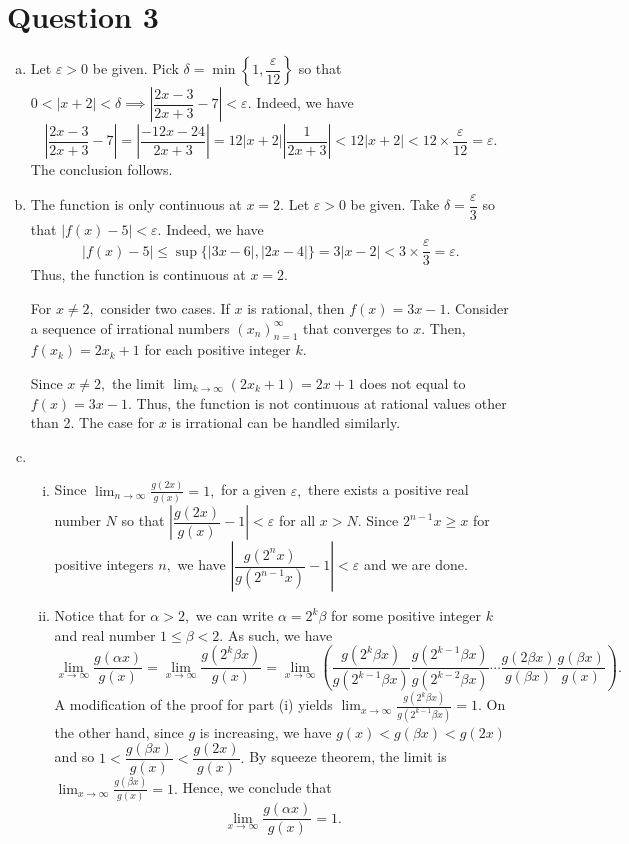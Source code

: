 \documentclass{article}
\begin{document}
\section*{Question 3}
\begin{enumerate}[(a)]
    \item Let $\varepsilon>0$ be given. Pick $\delta=\min\left\{1,\dfrac{\varepsilon}{12}\right\}$ so that $0<|x+2|<\delta\implies \left|\dfrac{2x-3}{2x+3}-7\right|<\varepsilon.$ Indeed, we have $$\left|\frac{2x-3}{2x+3}-7\right|=\left|\frac{-12x-24}{2x+3}\right|=12|x+2|\left|\frac{1}{2x+3}\right|<12|x+2|<12\times\frac{\varepsilon}{12}=\varepsilon.$$ The conclusion follows.
    \item The function is only continuous at $x=2.$ Let $\varepsilon>0$ be given. Take $\delta=\dfrac{\varepsilon}{3}$ so that $|f(x)-5|<\varepsilon.$ Indeed, we have $$ |f(x)-5|\leq \sup\{|3x-6|,|2x-4|\}=3|x-2|<3\times\frac{\varepsilon}{3}=\varepsilon.$$ Thus, the function is continuous at $x=2.$
    
    For $x\neq2,$ consider two cases. If $x$ is rational, then $f(x)=3x-1.$ Consider a sequence of irrational numbers $(x_n)^{\infty}_{n=1}$ that converges to $x.$ Then, $f(x_k)=2x_k+1$ for each positive integer $k.$ 
    
    Since $x\neq 2,$ the limit $\displaystyle\lim_{k\to\infty}(2x_k+1)=2x+1$ does not equal to $f(x)=3x-1.$ Thus, the function is not continuous at rational values other than 2. The case for $x$ is irrational can be handled similarly.
    \item \begin{enumerate}[(i)]
        \item Since $\displaystyle\lim_{n\to\infty}\frac{g(2x)}{g(x)}=1,$ for a given $\varepsilon,$ there exists a positive real number $N$ so that $\left|\dfrac{g(2x)}{g(x)}-1\right|<\varepsilon$ for all $x>N.$ Since $2^{n-1}x\geq x$ for positive integers $n,$ we have $\left|\dfrac{g(2^nx)}{g(2^{n-1}x)}-1\right|<\varepsilon$ and we are done.
        \item Notice that for $\alpha>2,$ we can write $\alpha=2^k\beta$ for some positive integer $k$ and real number $1\leq\beta<2.$ As such, we have $$\lim_{x\to\infty}\frac{g(\alpha x)}{g(x)}=\lim_{x\to\infty}\frac{g(2^k\beta x)}{g(x)}=\lim_{x\to\infty}\left(\frac{g(2^k\beta x)}{g(2^{k-1}\beta x)}\frac{g(2^{k-1}\beta x)}{g(2^{k-2}\beta x)}\cdots \frac{g(2\beta x)}{g(\beta x)}\frac{g(\beta x)}{g(x)}\right).$$
        A modification of the proof for part (i) yields $\displaystyle\lim_{x\to\infty}\frac{g(2^k\beta x)}{g(2^{k-1}\beta x)}=1.$ On the other hand, since $g$ is increasing, we have $g(x)<g(\beta x)<g(2x)$ and so $1<\dfrac{g(\beta x)}{g(x)}<\dfrac{g(2x)}{g(x)}.$ By squeeze theorem, the limit is $\displaystyle\lim_{x\to\infty}\frac{g(\beta x)}{g(x)}=1.$ Hence, we conclude that $$\lim_{x\to\infty}\frac{g(\alpha x)}{g(x)}=1.$$
    \end{enumerate}
\end{enumerate}
\end{document}
